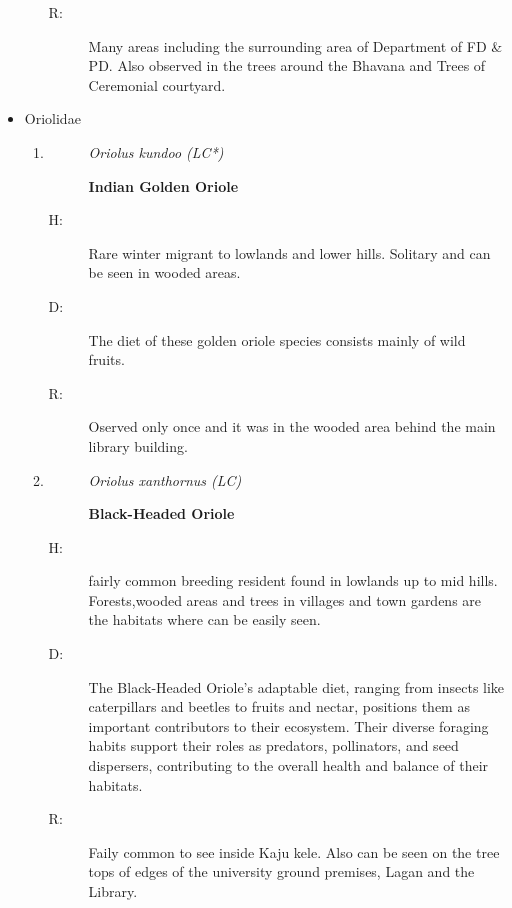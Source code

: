 \begin{itemize}
\begin{enumerate}
\begin{description}
\item[R: ]%
Many areas including the surrounding area of Department of FD \& PD. Also observed in the trees around the Bhavana and Trees of Ceremonial courtyard.%
\end{description}%
\end{enumerate}%
\item%
Oriolidae%
\begin{enumerate}%
\item%
\begin{description}%
\item[]%
\textit{Oriolus kundoo (LC*)}%
\item[]%
\textbf{Indian Golden Oriole}%
\end{description}%
\begin{description}%
\item[H: ]%
Rare winter migrant to lowlands and lower hills. Solitary and can be seen in wooded areas.%
\item[D: ]%
The diet of these golden oriole species consists mainly of wild fruits. %
\item[R: ]%
Oserved only once and it was in the wooded area behind the main library building.%
\end{description}%
\item%
\begin{description}%
\item[]%
\textit{Oriolus xanthornus (LC)}%
\item[]%
\textbf{Black{-}Headed Oriole}%
\end{description}%
\begin{description}%
\item[H: ]%
fairly common breeding resident found in lowlands up to mid hills. Forests,wooded areas and trees in villages and town gardens are the habitats where can be easily seen.%
\item[D: ]%
The Black{-}Headed Oriole's adaptable diet, ranging from insects like caterpillars and beetles to fruits and nectar, positions them as important contributors to their ecosystem. Their diverse foraging habits support their roles as predators, pollinators, and seed dispersers, contributing to the overall health and balance of their habitats.%
\item[R: ]%
Faily common to see inside Kaju kele. Also can be seen on the tree tops of edges of the university ground premises, Lagan and the Library.%
\end{description}%
\end{enumerate}%

\end{itemize}
